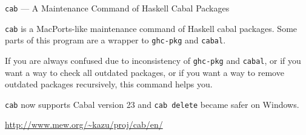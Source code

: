 \begin{hcarentry}[updated]{{\tt cab} --- A Maintenance Command of Haskell Cabal Packages}
\makeheader

{\tt cab} is a MacPorts-like maintenance command of Haskell cabal packages. Some parts of this program are a wrapper to {\tt ghc-pkg} and {\tt cabal}.

If you are always confused due to inconsistency of {\tt ghc-pkg} and {\tt cabal}, or if you want a way to check all outdated packages, or if you want a way to remove outdated packages recursively, this command helps you.

{\tt cab} now supports Cabal version 23 and {\tt cab delete} became safer on Windows.

\FurtherReading
  \url{http://www.mew.org/~kazu/proj/cab/en/}
\end{hcarentry}
